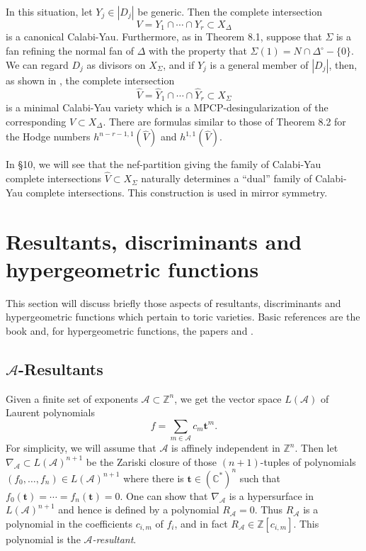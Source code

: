 \documentclass{amsart}
\theoremstyle{plain}
\theoremstyle{definition}
\begin{document}
	In this situation, let $Y_j \in |D_j|$ be generic.  Then the
complete intersection
\[
V = Y_1\cap\cdots\cap Y_r \subset X_\Delta
\]
is a canonical Calabi-Yau.  Furthermore, as in Theorem 8.1, suppose
that $\Sigma$ is a fan refining the normal fan of $\Delta$ with the
property that $\Sigma(1) = N\cap\Delta^\circ-\{0\}$.  We can regard
$D_j$ as divisors on $X_\Sigma$, and if $\widehat Y_j$ is a general
member of $|D_j|$, then, as shown in \cite{BB3}, the complete
intersection
\begin{equation}
\widehat V = \widehat Y_1\cap\cdots\cap \widehat Y_r \subset
X_\Sigma
\tag{8.5}\label{eq:8.5}
\end{equation}
is a minimal Calabi-Yau variety which is a MPCP-desingularization of
the corresponding $V \subset X_\Delta$.  There are formulas similar to
those of Theorem 8.2 for the Hodge numbers $h^{n-r-1,1}(\widehat V)$
and $h^{1,1}(\widehat V)$.

	In \S10, we will see that the nef-partition giving the family
of Calabi-Yau complete intersections $\widehat V \subset X_\Sigma$
naturally determines a ``dual'' family of Calabi-Yau complete
intersections.  This construction is used in mirror symmetry.

\section{Resultants, discriminants and hypergeometric functions}

	This section will discuss briefly those aspects of resultants,
discriminants and hypergeometric functions which pertain to toric
varieties.  Basic references are the book \cite{GKZ1} and, for
hypergeometric functions, the papers \cite{GKZ2} and \cite{GKZ3}.

	\subsection{\texorpdfstring{$\mathcal{A}$}{A}-Resultants} Given a finite set of
exponents $\mathcal{A} \subset \mathbb{Z}^n$, we get the vector space
$L(\mathcal{A})$ of Laurent polynomials
\[
f = \sum_{m \in \mathcal{A}} c_m \mathbf{t}^m.
\]
For simplicity, we will assume that $\mathcal{A}$ is affinely independent
in $\mathbb{Z}^n$.  Then let $\nabla_{\mathcal{A}} \subset L(\mathcal{A})^{n+1}$
be the Zariski closure of those $(n+1)$-tuples of polynomials
$(f_0,\dots,f_n) \in L(\mathcal{A})^{n+1}$ where there is $\mathbf{t} \in
(\mathbb{C}^*)^n$ such that $f_0(\mathbf{t}) = \cdots = f_n(\mathbf{t}) =
0$.  One can show that $\nabla_{\mathcal{A}}$ is a hypersurface in
$L(\mathcal{A})^{n+1}$ and hence is defined by a polynomial $R_{\mathcal{A}} =
0$.  Thus $R_{\mathcal{A}}$ is a polynomial in the coefficients $c_{i,m}$
of $f_i$, and in fact $R_{\mathcal{A}} \in \mathbb{Z}[c_{i,m}]$.  This
polynomial is the {\it $\mathcal{A}$-resultant\/}.
\end{document}
